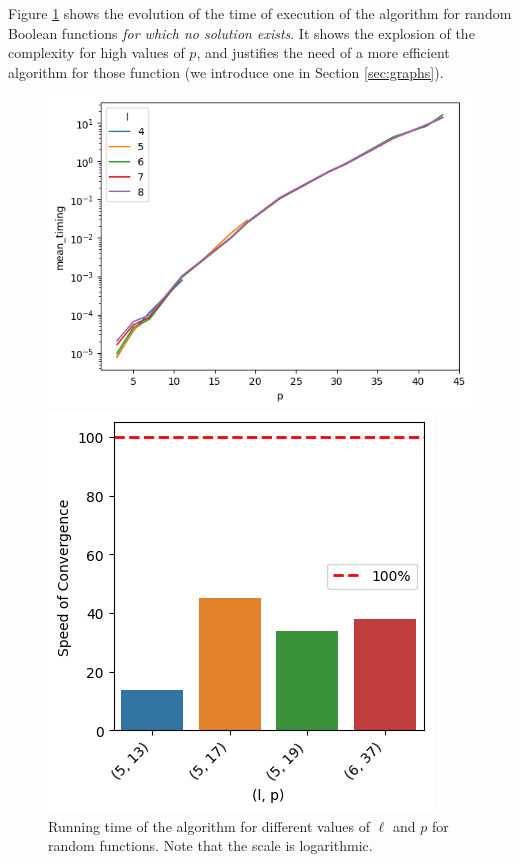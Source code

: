 Figure \ref{fig:lineplot_timings} shows the evolution of the time of execution of the algorithm for random Boolean functions \emph{for which no solution exists}.  It shows the explosion of the complexity for high values of
$p$, and justifies the need of a more efficient algorithm for those function (we introduce one in Section \ref{sec:graphs}).  


\begin{figure}
    \centering
    \begin{minipage}{0.55\textwidth}
        \centering
        \includegraphics[width=\linewidth]{img/p_encodings/lineplot_timings.png}
        \caption{Running time of the algorithm for different values of $\ell$ and $p$ for random functions. Note that the scale is logarithmic.}        
        \label{fig:lineplot_timings}
        \end{minipage}\hspace{0.04\textwidth}
    \begin{minipage}{0.35\textwidth}
        \centering
        \includegraphics[width=\linewidth]{img/p_encodings/barplot.png}

\end{minipage}
\end{figure}
